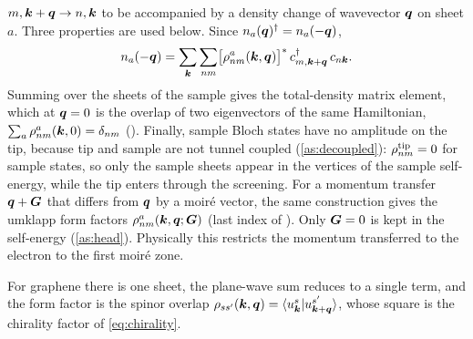 $m,\bm k+\bm q\to n,\bm k$ to be accompanied by a density change of wavevector $\bm q$ on sheet $a$. Three properties are
used below. Since $n_a(\bm q)^\dagger=n_a(-\bm q)$,
\begin{equation}
n_a(-\bm q)=\sum_{\bm k}\sum_{nm}\bigl[\rho^a_{nm}(\bm k,\bm q)\bigr]^*\,c^\dagger_{m,\bm k+\bm q}\,c_{n\bm k} .
\label{eq:nminusq}
\end{equation}
Summing over the sheets of the sample gives the total-density matrix element, which at $\bm q=0$ is the overlap of
two eigenvectors of the same Hamiltonian, $\sum_a\rho^a_{nm}(\bm k,0)=\delta_{nm}$
(). Finally, sample Bloch states have no amplitude on the tip, because
tip and sample are not tunnel coupled (\cref{as:decoupled}): $\rho^{\rm tip}_{nm}=0$ for sample states, so only
the sample sheets appear in the vertices of the sample self-energy, while the tip enters through the screening.
For a momentum transfer $\bm q+\bm G$ that differs from $\bm q$ by a moir\'e vector, the same construction gives the
umklapp form factors $\rho^a_{nm}(\bm k,\bm q;\bm G)$ (last index of ). Only $\bm G=0$ is kept in the
self-energy (\cref{as:head}). Physically this restricts the momentum transferred to the electron to the first
moir\'e zone.

For graphene there is one sheet, the plane-wave sum reduces to a single term, and the form factor is the
spinor overlap $\rho_{ss'}(\bm k,\bm q)=\langle u^s_{\bm k}|u^{s'}_{\bm k+\bm q}\rangle$, whose square is the chirality factor
of \cref{eq:chirality}.


